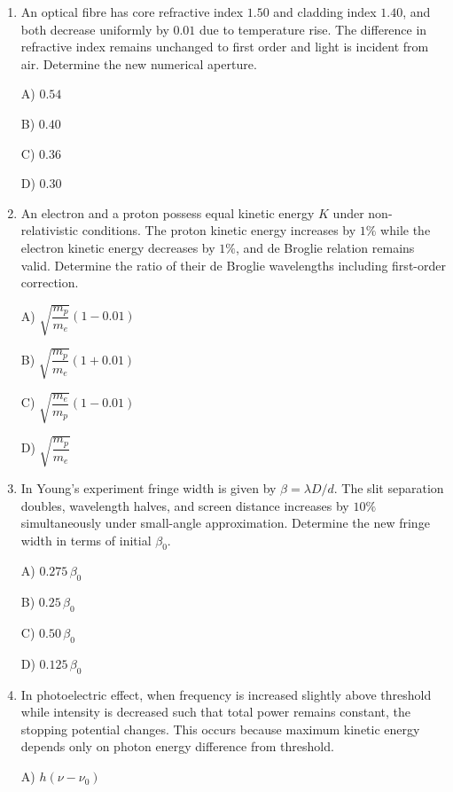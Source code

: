 \documentclass[12pt]{article}
\begin{document}
\begin{enumerate}[leftmargin=*]
A) \(\times 8\)  

B) \(\times 10\)  

C) \(\times 6\)  

D) \(\times 12\)  


\item An optical fibre has core refractive index \(1.50\) and cladding index \(1.40\), and both decrease uniformly by \(0.01\) due to temperature rise. The difference in refractive index remains unchanged to first order and light is incident from air. Determine the new numerical aperture.  

A) \(0.54\)  

B) \(0.40\)  

C) \(0.36\)  

D) \(0.30\)  


\item An electron and a proton possess equal kinetic energy \(K\) under non-relativistic conditions. The proton kinetic energy increases by \(1\%\) while the electron kinetic energy decreases by \(1\%\), and de Broglie relation remains valid. Determine the ratio of their de Broglie wavelengths including first-order correction.  

A) \(\sqrt{\dfrac{m_p}{m_e}}\left(1-0.01\right)\)  

B) \(\sqrt{\dfrac{m_p}{m_e}}\left(1+0.01\right)\)  

C) \(\sqrt{\dfrac{m_e}{m_p}}\left(1-0.01\right)\)  

D) \(\sqrt{\dfrac{m_p}{m_e}}\)  


\item In Young’s experiment fringe width is given by \(\beta=\lambda D/d\). The slit separation doubles, wavelength halves, and screen distance increases by \(10\%\) simultaneously under small-angle approximation. Determine the new fringe width in terms of initial \(\beta_0\).  

A) \(0.275\,\beta_0\)  

B) \(0.25\,\beta_0\)  

C) \(0.50\,\beta_0\)  

D) \(0.125\,\beta_0\)  


\item In photoelectric effect, when frequency is increased slightly above threshold while intensity is decreased such that total power remains constant, the stopping potential changes. This occurs because maximum kinetic energy depends only on photon energy difference from threshold.  

A) \(h(\nu-\nu_0)\)  


\end{enumerate}
\end{document}
